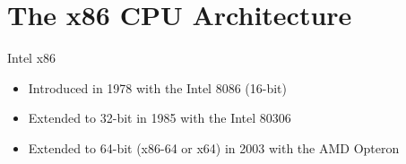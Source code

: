 \part{The x86 CPU Architecture}
\frame{\partpage}

\begin{frame}{Intel x86}
    \begin{itemize}
        \pause\item Introduced in 1978 with the Intel 8086 (16-bit)
        \pause\item Extended to 32-bit in 1985 with the Intel 80306
        \pause\item Extended to 64-bit (x86-64 or x64) in 2003 with the AMD Opteron
    \end{itemize}
\end{frame}


